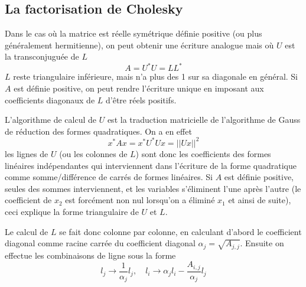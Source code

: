\documentclass[a4paper,11pt]{article}
\begin{document}
\begin{giacjshere}
\subsection{La factorisation de Cholesky} 
Dans le cas o\`u la matrice est r\'eelle sym\'etrique d\'efinie
positive (ou plus g\'en\'eralement hermitienne), 
on peut obtenir une \'ecriture analogue
mais o\`u $U$ est la transconjugu\'ee de $L$
\[ A=U^* U = L L^* \]
$L$ reste triangulaire
inf\'erieure, mais n'a plus des 1 sur sa diagonale en g\'en\'eral. Si
$A$ est d\'efinie positive, on peut rendre l'\'ecriture unique en
imposant aux coefficients diagonaux de $L$ d'\^etre r\'eels positifs.

L'algorithme de calcul de $U$ est la traduction matricielle de l'algorithme
de Gauss de réduction des formes quadratiques. On a en effet
\[ x^* A x=x^* U^* U x = ||Ux||^2 \]
les lignes de $U$ (ou les colonnes de $L$) sont donc les coefficients
des formes linéaires indépendantes qui interviennent dans l'écriture
de la forme quadratique comme somme/différence de carrés de formes
linéaires. Si $A$
est définie positive, seules des sommes interviennent, et les
variables s'éliminent l'une après l'autre (le coefficient de $x_2$ est forcément
non nul lorsqu'on a éliminé $x_1$ et ainsi de suite), ceci explique
la forme triangulaire de $U$ et $L$.

Le calcul de $L$ se fait donc colonne par colonne, en calculant d'abord le
coefficient diagonal comme racine carr\'ee du coefficient diagonal 
$\alpha_j=\sqrt{A_{j,j}}$.
Ensuite on effectue les combinaisons de ligne sous la forme
\[ l_j \rightarrow \frac{1}{\alpha_j}l_j, \quad  l_i \rightarrow \alpha_j l_i - \frac{A_{i,j}}{\alpha_j} l_j \]


\end{giacjshere}
\end{document}

